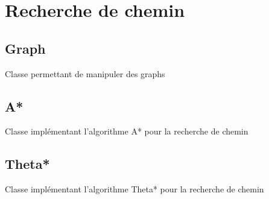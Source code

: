 \documentclass[letterpaper,10pt,french]{sphinxmanual}
\begin{document}
\chapter{Recherche de chemin}
\label{recherche_chemin::doc}\label{recherche_chemin:recherche-de-chemin}

\section{Graph}
\label{recherche_chemin:graph}\label{recherche_chemin:module-lib.recherche_chemin.graph}

\begin{fulllineitems}
\label{recherche_chemin:lib.recherche_chemin.graph.Graph}
Classe permettant de manipuler des graphs

\end{fulllineitems}



\section{A*}
\label{recherche_chemin:a}\label{recherche_chemin:module-lib.recherche_chemin.astar}

\begin{fulllineitems}
\label{recherche_chemin:lib.recherche_chemin.astar.Astar}
Classe implémentant l'algorithme A* pour la recherche de chemin

\end{fulllineitems}



\section{Theta*}
\label{recherche_chemin:theta}\label{recherche_chemin:module-lib.recherche_chemin.thetastar}

\begin{fulllineitems}
\label{recherche_chemin:lib.recherche_chemin.thetastar.Thetastar}
Classe implémentant l'algorithme Theta* pour la recherche de chemin

\end{fulllineitems}
\end{document}

